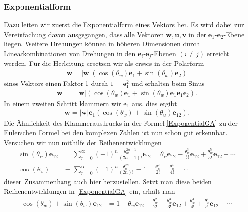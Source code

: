 \subsubsection{Exponentialform}
Dazu leiten wir zuerst die Exponentialform eines Vektors her. Es wird dabei zur Vereinfachung davon ausgegangen, dass alle Vektoren $\mathbf{w}, \mathbf{u}, \mathbf{v}$ in der $\mathbf{e}_{1}$-$\mathbf{e}_{2}$-Ebene liegen. Weitere Drehungen können in höheren Dimensionen durch Linearkombinationen von Drehungen in den $\mathbf{e}_{i}$-$\mathbf{e}_{j}$-Ebenen $(i\not=j)$ erreicht werden. Für die Herleitung ersetzen wir als erstes in der Polarform
\begin{align}
\mathbf{w} = |\mathbf{w}| \left(\cos(\theta_w) \mathbf{e}_1 + \sin(\theta_w) \mathbf{e}_2\right)
\end{align}
eines Vektors einen Faktor 1 durch $1=\mathbf{e}_1^2$ und erhalten beim Sinus
\begin{align}\label{e1ausklammern}
\mathbf{w} &= |\mathbf{w}| \left(\cos(\theta_w) \mathbf{e}_1 + \sin(\theta_w) \mathbf{e}_1\mathbf{e}_1\mathbf{e}_2\right). 
\end{align}
In einem zweiten Schritt klammern wir $\mathbf{e}_1$ aus, dies ergibt
\begin{align}
\mathbf{w} = |\mathbf{w}|\mathbf{e}_1\left(\cos(\theta_w)+ \sin(\theta_w) \mathbf{e}_{12}\right). \label{ExponentialGA}
\end{align}
Die Ähnlichkeit des Klammerausdrucks in der Formel \eqref{ExponentialGA} zu der Eulerschen Formel bei den komplexen Zahlen ist nun schon gut erkennbar. Versuchen wir nun mithilfe der Reihenentwicklungen
\begin{align}
\sin(\theta_w)\mathbf{e}_{12}&=\sum _{n=0}^{\infty }(-1)^{n}{\frac {\theta_w^{2n+1}}{(2n+1)!}}\mathbf{e}_{12} =\theta_w\mathbf{e}_{12}-{\frac {\theta_w^{3}}{3!}}\mathbf{e}_{12}+{\frac {\theta_w^{5}}{5!}}\mathbf{e}_{12}-\cdots \\
\cos(\theta_w)&=\sum _{n=0}^{\infty }(-1)^{n}{\frac {\theta_w^{2n}}{(2n)!}} =1-{\frac {\theta_w^{2}}{2!}}+{\frac {\theta_w^{4}}{4!}}-\cdots
\end{align}
diesen Zusammenhang auch hier herzustellen. Setzt man diese beiden Reihenentwicklungen in \eqref{ExponentialGA} ein, erhält man
\begin{align}
\cos(\theta_w)+ \sin(\theta_w) \mathbf{e}_{12} &= 1+\theta_w\mathbf{e}_{12}-{\frac {\theta_w^{2}}{2!}}-{\frac {\theta_w^{3}}{3!}}\mathbf{e}_{12}+{\frac {\theta_w^{4}}{4!}}+{\frac {\theta_w^{5}}{5!}}\mathbf{e}_{12}-\cdots
\end{align}
